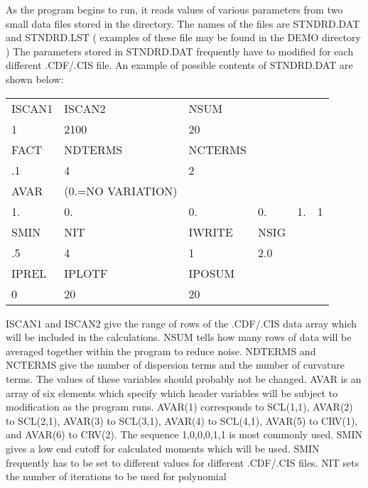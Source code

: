       As the program begins to run, it reads values of various parameters
   from two small data files stored in the directory.
   The names of the files are STNDRD.DAT and STNDRD.LST ( examples of
   these file may be found in the DEMO directory )
   The parameters
   stored in STNDRD.DAT frequently have to modified for each different
   .CDF/.CIS file.  An example of possible contents of STNDRD.DAT are
   shown below:
\begin{center}
\begin{tabular}{||l l l l l l ||}
\hline
           ISCAN1  &   ISCAN2 &   NSUM  &     &        &  \\
           1       &   2100   &   20    &     &        &  \\
           FACT    &   NDTERMS &  NCTERMS &   &        &  \\
           .1      &   4       &  2       &   &        &  \\
           AVAR & (0.=NO VARIATION) &     &   &        &  \\
           1.   &     0.  &      0. &       0.  &      1.   &  1 \\
           SMIN &      NIT &      IWRITE &  NSIG  &      &  \\
           .5   &      4   &      1    &    2.0   &      &  \\
           IPREL  &    IPLOTF &   IPOSUM  &       &      &  \\
           0    &      20    &    20   &          &      &  \\
\hline
\end{tabular}
\end{center}
      ISCAN1 and ISCAN2 give the range of rows of the .CDF/.CIS data array
   which will be included in the calculations.  NSUM tells how many rows
   of data will be averaged together within the program to reduce noise.
   NDTERMS and NCTERMS give the number of dispersion terms and the number
   of curvature terms.  The values of these variables should probably not
   be changed.  AVAR is an array of six elements which specify which
   header variables will be subject to modification as the program runs.
   AVAR(1) corresponds to SCL(1,1), AVAR(2) to SCL(2,1), AVAR(3) to
   SCL(3,1), AVAR(4) to SCL(4,1), AVAR(5) to CRV(1), and AVAR(6) to
   CRV(2). The sequence {1,0,0,0,1,1} is most commonly used. SMIN gives a
   low end cutoff for calculated moments which will be used. SMIN
   frequently has to be set to different values for different .CDF/.CIS
   files. NIT sets the number of iterations to be used for polynomial
